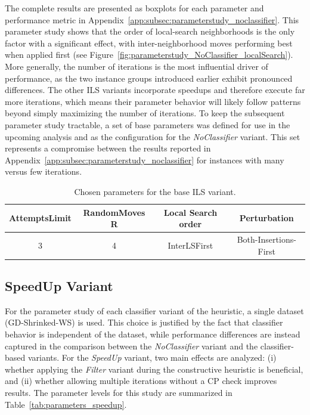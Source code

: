 The complete results are presented as boxplots for each parameter and performance metric in
Appendix~\ref{app:subsec:parameterstudy_noclassifier}. This parameter study shows that the order of local-search neighborhoods
is the only factor with a significant effect, with inter-neighborhood moves performing best when applied first
(see Figure~\ref{fig:parameterstudy_NoClassifier_localSearch}). More generally, the number of iterations is the most
influential driver of performance, as the two instance groups introduced earlier exhibit pronounced differences.
The other \gls{ILS} variants incorporate speedups and therefore execute far more iterations, which means their parameter behavior
will likely follow patterns beyond simply maximizing the number of iterations. To keep the subsequent parameter study tractable,
a set of base parameters was defined for use in the upcoming analysis and as the configuration for the \textit{NoClassifier} variant.
This set represents a compromise between the results reported in Appendix~\ref{app:subsec:parameterstudy_noclassifier} for instances
with many versus few iterations.
\begin{table}[ht]
    \centering
    \begin{tabular}{@{}cccc@{}}
        \toprule
        AttemptsLimit & RandomMoves        R & Local Search order & Perturbation          \\
        \midrule
        3             & 4                    & InterLSFirst       & Both-Insertions-First \\
        \bottomrule
    \end{tabular}
    \caption{Chosen parameters for the base ILS variant.}
    \label{tab:parameters_final_noclassifier}
\end{table}

\subsection{SpeedUp Variant}
\label{subsec_parameterStuy_speedup}
For the parameter study of each classifier variant of the heuristic, a single dataset (GD-Shrinked-WS) is used.
This choice is justified by the fact that classifier behavior is independent of the dataset, while performance differences
are instead captured in the comparison between the \textit{NoClassifier} variant and the classifier-based variants.
For the \textit{SpeedUp} variant, two main effects are analyzed: (i) whether applying the \textit{Filter} variant during the
constructive heuristic is beneficial, and (ii) whether allowing multiple iterations without a \gls{CP} check improves results.
The parameter levels for this study are summarized in Table~\ref{tab:parameters_speedup}.

